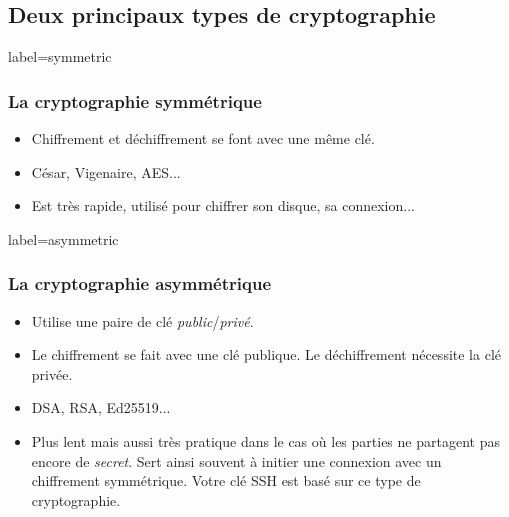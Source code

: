 \documentclass{beamer}
\begin{document}
    \subsection{Deux principaux types de cryptographie}
        \begin{frame}{label=symmetric}
            \frametitle{La cryptographie symmétrique}
            \begin{center}
                \begin{itemize}
                    \item Chiffrement et déchiffrement se font avec une même clé.
                    \item César, Vigenaire, AES...
                    \item Est très rapide, utilisé pour chiffrer son disque, sa connexion...
                \end{itemize}
            \end{center}
        \end{frame}
        \begin{frame}{label=asymmetric}
            \frametitle{La cryptographie asymmétrique}
            \begin{center}
                \begin{itemize}
                    \item Utilise une paire de clé \textit{public}/\textit{privé}.
                    \item Le chiffrement se fait avec une clé publique. Le déchiffrement nécessite la clé privée.
                    \item DSA, RSA, Ed25519...
                    \item Plus lent mais aussi très pratique dans le cas où les parties ne partagent pas encore de \textit{secret}. Sert ainsi souvent à initier une connexion avec un chiffrement symmétrique. Votre clé SSH est basé sur ce type de cryptographie.
                \end{itemize}
            \end{center}
        \end{frame}
\end{document}
